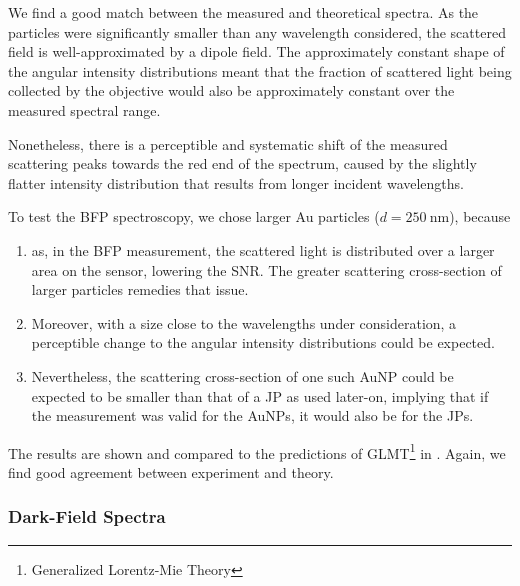 \documentclass[10pt]{article}
\newcommand{\reffig}[2]{\mbox{\sffamily{Figure \ref{#1}#2}}}
\begin{document}

We find a good match between the measured and theoretical spectra. 
As the particles were significantly smaller than any wavelength considered, the scattered field is well-approximated by a dipole field. 
The approximately constant shape of the angular intensity distributions meant that the fraction of scattered light being collected by the objective would also be approximately constant over the measured spectral range.

Nonetheless, there is a perceptible and systematic shift of the measured scattering peaks towards the red end of the spectrum, caused by the slightly flatter intensity distribution that results from longer incident wavelengths.


To test the BFP spectroscopy, we chose larger Au particles ($d=\SI{250}{\nano\meter}$), because
\begin{enumerate}[label=(\alph*)]
    \item as, in the BFP measurement, the scattered light is distributed over a larger area on the sensor, lowering the SNR. The greater scattering cross-section of larger particles remedies that issue. 
    \item Moreover, with a size close to the wavelengths under consideration, a perceptible change to the angular intensity distributions could be expected. 
    \item Nevertheless, the scattering cross-section of one such AuNP could be expected to be smaller than that of a JP as used later-on, implying that if the measurement was valid for the AuNPs, it would also be for the JPs. 
\end{enumerate}

The results are shown and compared to the predictions of GLMT\footnote{Generalized Lorentz-Mie Theory}\cite{BohrenHuffman, GouesbetGrehan} in \reffig{fig:AuNP}{B}. 
Again, we find good agreement between experiment and theory. 

\subsubsection*{Dark-Field Spectra}
\end{document}
